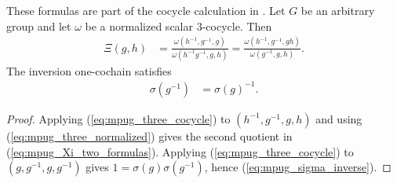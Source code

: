 \begin{lemma}
    \label{thm:mpug_inversion_cochain_formulas}
    \leanok
    These formulas are part of the cocycle calculation in
    \cite[lines~5967--5979]{FrancoRubio2025MPUGauging}.
    Let $G$ be an arbitrary group and let $\omega$ be a normalized scalar
    $3$-cocycle. Then
    \begin{align}
        \Xi(g,h) & =
        \frac{\omega(h^{-1},g^{-1},g)}
        {\omega(h^{-1}g^{-1},g,h)}
        =
        \frac{\omega(h^{-1},g^{-1},gh)}
        {\omega(g^{-1},g,h)}.
        \label{eq:mpug_Xi_two_formulas}
    \end{align}
    The inversion one-cochain satisfies
    \begin{align}
        \sigma(g^{-1}) & =\sigma(g)^{-1}.
        \label{eq:mpug_sigma_inverse}
    \end{align}
\end{lemma}
\begin{proof}\leanok
    Applying (\ref{eq:mpug_three_cocycle}) to $(h^{-1},g^{-1},g,h)$ and using
    (\ref{eq:mpug_three_normalized}) gives the second quotient in
    (\ref{eq:mpug_Xi_two_formulas}). Applying
    (\ref{eq:mpug_three_cocycle}) to
    $(g,g^{-1},g,g^{-1})$ gives
    $1=\sigma(g)\sigma(g^{-1})$, hence
    (\ref{eq:mpug_sigma_inverse}).
\end{proof}

